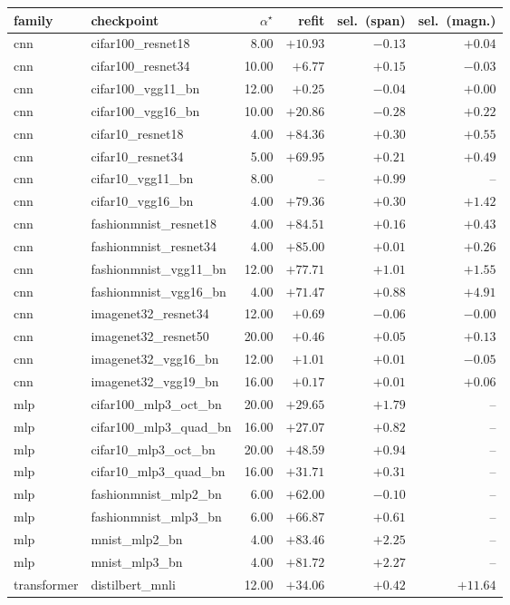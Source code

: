 \begin{tabular}{llrrrr}
\toprule
family & checkpoint & $\alpha^\star$ & refit & sel.\ (span) & sel.\ (magn.)\\
\midrule
cnn & cifar100\_resnet18 & 8.00 & $+10.93$ & $-0.13$ & $+0.04$\\
cnn & cifar100\_resnet34 & 10.00 & $+6.77$ & $+0.15$ & $-0.03$\\
cnn & cifar100\_vgg11\_bn & 12.00 & $+0.25$ & $-0.04$ & $+0.00$\\
cnn & cifar100\_vgg16\_bn & 10.00 & $+20.86$ & $-0.28$ & $+0.22$\\
cnn & cifar10\_resnet18 & 4.00 & $+84.36$ & $+0.30$ & $+0.55$\\
cnn & cifar10\_resnet34 & 5.00 & $+69.95$ & $+0.21$ & $+0.49$\\
cnn & cifar10\_vgg11\_bn & 8.00 & -- & $+0.99$ & --\\
cnn & cifar10\_vgg16\_bn & 4.00 & $+79.36$ & $+0.30$ & $+1.42$\\
cnn & fashionmnist\_resnet18 & 4.00 & $+84.51$ & $+0.16$ & $+0.43$\\
cnn & fashionmnist\_resnet34 & 4.00 & $+85.00$ & $+0.01$ & $+0.26$\\
cnn & fashionmnist\_vgg11\_bn & 12.00 & $+77.71$ & $+1.01$ & $+1.55$\\
cnn & fashionmnist\_vgg16\_bn & 4.00 & $+71.47$ & $+0.88$ & $+4.91$\\
cnn & imagenet32\_resnet34 & 12.00 & $+0.69$ & $-0.06$ & $-0.00$\\
cnn & imagenet32\_resnet50 & 20.00 & $+0.46$ & $+0.05$ & $+0.13$\\
cnn & imagenet32\_vgg16\_bn & 12.00 & $+1.01$ & $+0.01$ & $-0.05$\\
cnn & imagenet32\_vgg19\_bn & 16.00 & $+0.17$ & $+0.01$ & $+0.06$\\
mlp & cifar100\_mlp3\_oct\_bn & 20.00 & $+29.65$ & $+1.79$ & --\\
mlp & cifar100\_mlp3\_quad\_bn & 16.00 & $+27.07$ & $+0.82$ & --\\
mlp & cifar10\_mlp3\_oct\_bn & 20.00 & $+48.59$ & $+0.94$ & --\\
mlp & cifar10\_mlp3\_quad\_bn & 16.00 & $+31.71$ & $+0.31$ & --\\
mlp & fashionmnist\_mlp2\_bn & 6.00 & $+62.00$ & $-0.10$ & --\\
mlp & fashionmnist\_mlp3\_bn & 6.00 & $+66.87$ & $+0.61$ & --\\
mlp & mnist\_mlp2\_bn & 4.00 & $+83.46$ & $+2.25$ & --\\
mlp & mnist\_mlp3\_bn & 4.00 & $+81.72$ & $+2.27$ & --\\
transformer & distilbert\_mnli & 12.00 & $+34.06$ & $+0.42$ & $+11.64$\\
\bottomrule
\end{tabular}
